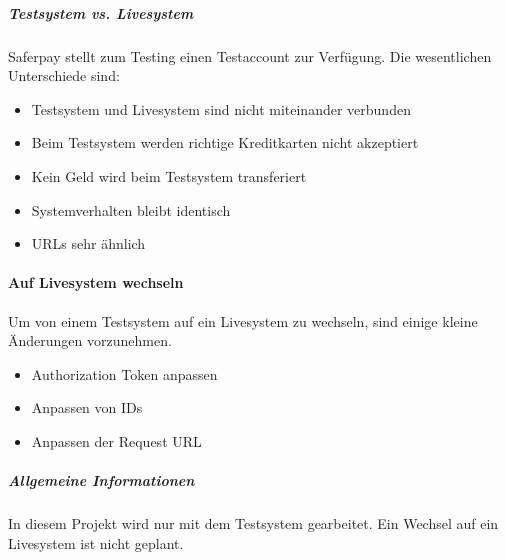 \subparagraph{Testsystem vs. Livesystem}\label{testvslive}
Saferpay stellt zum Testing einen Testaccount zur Verfügung. Die wesentlichen Unterschiede sind:
\begin{itemize}
	\item Testsystem und Livesystem sind nicht miteinander verbunden
	\item Beim Testsystem werden richtige Kreditkarten nicht akzeptiert
	\item Kein Geld wird beim Testsystem transferiert
	\item Systemverhalten bleibt identisch
	\item URLs sehr ähnlich 
\end{itemize}

\paragraph{Auf Livesystem wechseln}
Um von einem Testsystem auf ein Livesystem zu wechseln, sind einige kleine Änderungen vorzunehmen. 
\begin{itemize}
	\item Authorization Token anpassen
	\item Anpassen von IDs
	\item Anpassen der Request URL
\end{itemize} 

\subparagraph{Allgemeine Informationen}
In diesem Projekt wird nur mit dem Testsystem gearbeitet. Ein Wechsel auf ein Livesystem ist nicht geplant. 
 
